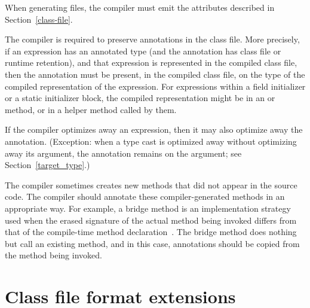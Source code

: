 \documentclass[10pt]{article}
\begin{document}
When generating  files, the compiler must emit the attributes
described in Section~\ref{class-file}.

The compiler is required to preserve annotations in the class file.  More
precisely, if an expression has an annotated type (and the annotation has
class file or runtime retention), and that expression is represented
in the compiled class file, then the annotation must be present, in the
compiled class file, on the type of the compiled representation of the
expression.  For expressions within a field initializer or a static
initializer block, the compiled representation might be in an 
or  method, or in a helper method called by them.

If the compiler optimizes away an expression, then it may also
optimize away the annotation.  (Exception:  when a type cast
is optimized away without optimizing away its argument, the
annotation remains on the argument; see Section~\ref{target_type}.)

The compiler sometimes creates new methods that did not appear in the
source code.  The compiler should annotate these compiler-generated methods
in an appropriate way.  For example, a bridge method is an implementation
strategy used when the erased signature of the actual method being invoked
differs from that of the compile-time method
declaration~\cite[\S15.12.4.5]{GoslingJSB2005}.  The bridge method does
nothing but call an existing method, and in this case, annotations should
be copied from the method being invoked.




\section{Class file format extensions\label{class-file}}
\end{document}
